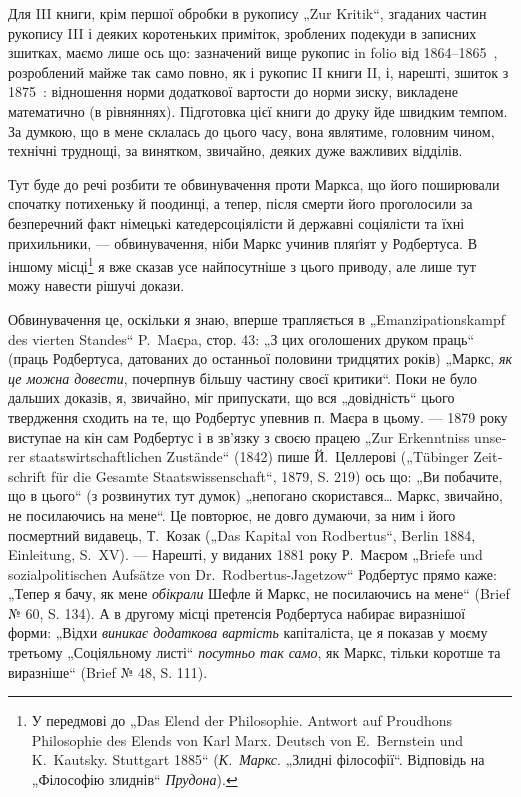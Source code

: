 Для III книги, крім першої обробки в рукопису „Zur Kritik“, згаданих
частин рукопису III і деяких коротеньких приміток, зроблених подекуди
в записних зшитках, маємо лише ось що: зазначений вище рукопис
in folio від 1864--1865~, розроблений майже так само повно, як
і рукопис II книги II, і, нарешті, зшиток з 1875~: відношення норми
додаткової вартости до норми зиску, викладене математично (в рівняннях).
Підготовка цієї книги до друку йде швидким темпом. За думкою,
що в мене склалась до цього часу, вона являтиме, головним чином, технічні
труднощі, за винятком, звичайно, деяких дуже важливих відділів.

Тут буде до речі розбити те обвинувачення проти Маркса, що його
поширювали спочатку потихеньку й поодинці, а тепер, після смерти його
проголосили за безперечний факт німецькі катедерсоціялісти й державні
соціялісти та їхні прихильники, — обвинувачення, ніби Маркс учинив
пляґіят у Родбертуса. В іншому місці\footnote{
У передмові до „Das Elend der Philosophie. Antwort auf Proudhons Philosophie
des Elends von Karl Marx. Deutsch von E.~Bernstein und K.~Kautsky.
Stuttgart 1885“ (\emph{К.~Маркс}. „Злидні філософії“. Відповідь на „Філософію злиднів“
\emph{Прудона}).
} я вже сказав усе найпосутніше
з цього приводу, але лише тут можу навести рішучі докази.

Обвинувачення це, оскільки я знаю, вперше трапляється в „\textgerman{Emanzipationskampf
des vierten Standes}“ P.~Maєpa, стор. 43: „З цих оголошених
друком праць“ (праць Родбертуса, датованих до останньої половини
тридцятих років) „Маркс, \emph{як це можна довести}, почерпнув більшу частину
своєї критики“. Поки не було дальших доказів, я, звичайно, міг
припускати, що вся „довідність“ цього твердження сходить на те, що
Родбертус упевнив п. Маєра в цьому. — 1879 року виступае на кін сам Родбертус
і в зв’язку з своєю працею „\textgerman{Zur Erkenntniss unserer staatswirtschaftlichen
Zustände}“ (1842) пише Й.~Целлерові („\textgerman{Tübinger Zeitschrift für
die Gesamte Staatswissenschaft}“, 1879, S. 219) ось що: „Ви побачите, що
в цього“ (з розвинутих тут думок) „непогано скористався\dots{} Маркс, звичайно,
не посилаючись на мене“. Це повторює, не довго думаючи, за ним
і його посмертний видавець, Т.~Козак („Das Kapital von Rodbertus“, Berlin
1884, Einleitung, S.~XV). — Нарешті, у виданих 1881 року Р.~Маєром
„Briefe und sozialpolitischen Aufsätze von Dr.~Rodbertus-Jagetzow“ Родбертус
прямо каже: „Тепер я бачу, як мене \emph{обікрали} Шефле й Маркс, не
посилаючись на мене“ (Brief № 60, S. 134). А в другому місці претенсія
Родбертуса набирає виразнішої форми: „Відхи \emph{виникає додаткова
вартість} капіталіста, це я показав у моєму третьому „Соціяльному листі“
\emph{посутньо так само}, як Маркс, тільки коротше та виразніше“ (Brief
№ 48, S. 111).

